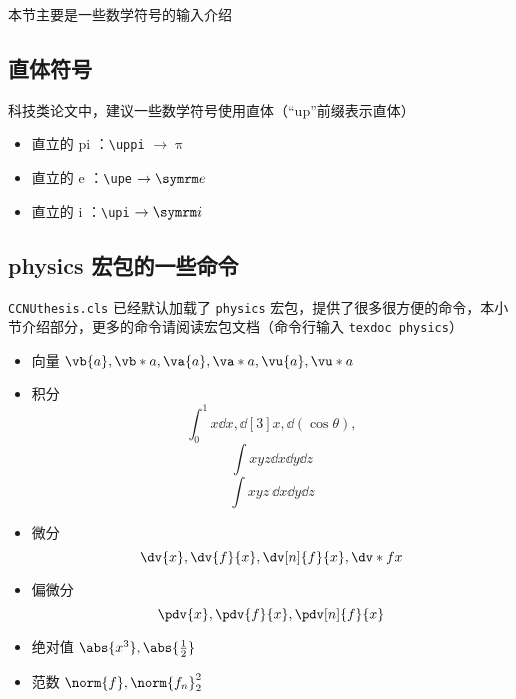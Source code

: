 本节主要是一些数学符号的输入介绍


\subsection{直体符号}

科技类论文中，建议一些数学符号使用直体（“up”前缀表示直体）
  \begin{itemize}
    \item 直立的 pi ：\verb|\uppi| $\to \uppi$
    \item 直立的 e ：\verb|\upe| $\to \upe$
    \item 直立的 i ：\verb|\upi| $\to \upi$
  \end{itemize}



\subsection{physics 宏包的一些命令}

\verb|CCNUthesis.cls| 已经默认加载了 \verb|physics| 宏包，提供了很多很方便的命令，本小节介绍部分，更多的命令请阅读宏包文档（命令行输入 \verb|texdoc physics|）

\begin{itemize}
  \item 向量 $\vb{a}, \vb*{a}, \va{a}, \va*{a}, \vu{a}, \vu*{a}$
  \item 积分
    \[
      \int_{0}^{1} x \dd{x},
      \dd[3]{x}, \dd(\cos\theta),
    \]
    \[
      \int xyz \dd{x} \dd{y} \dd{z}
    \]
    \[
      \int xyz \ \dd x \dd y \dd z    
    \]
  \item 微分
    \[
      \dv{x}, \dv{f}{x}, \dv[n]{f}{x}, \dv*{f}{x}
    \]
  \item 偏微分
    \[
      \pdv{x}, \pdv{f}{x}, \pdv[n]{f}{x}
    \]
  \item 绝对值 $\abs{x^3}, \abs{\frac{1}{2}}$
  \item 范数 $\norm{f}, \norm{f_n}_{2}^{2}$
\end{itemize}